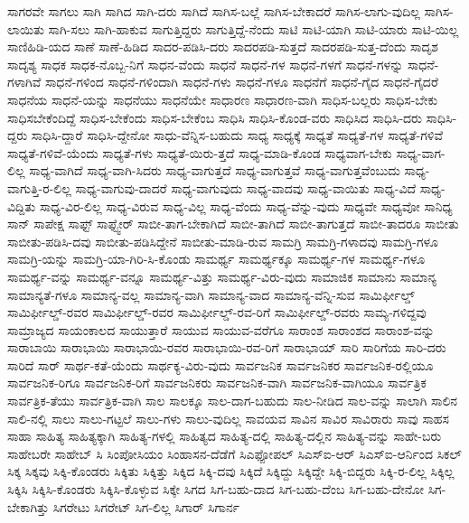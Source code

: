 {ಸಾಗರವೇ
ಸಾಗಲು
ಸಾಗಿ
ಸಾಗಿದ
ಸಾಗಿ-ದರು
ಸಾಗಿದೆ
ಸಾಗಿಸ-ಬಲ್ಲೆ
ಸಾಗಿಸ-ಬೇಕಾದರೆ
ಸಾಗಿಸ-ಲಾಗು-ವುದಿಲ್ಲ
ಸಾಗಿಸ-ಲಾಯಿತು
ಸಾಗಿ-ಸಲು
ಸಾಗಿ-ಹಾಕುವ
ಸಾಗುತ್ತಿದ್ದರು
ಸಾಗುತ್ತಿದ್ದೆ-ನೆಂದು
ಸಾಟಿ
ಸಾಟಿ-ಯಾಗಿ
ಸಾಟಿ-ಯಾರು
ಸಾಟಿ-ಯಿಲ್ಲ
ಸಾಣಿಹಿಡಿ-ಯದ
ಸಾಣೆ
ಸಾಣೆ-ಹಿಡಿದ
ಸಾದರ-ಪಡಿಸಿ-ದರು
ಸಾದರಪಡಿ-ಸುತ್ತದೆ
ಸಾದರಪಡಿ-ಸುತ್ತ-ದೆಂದು
ಸಾದೃಶ
ಸಾದೃಶ್ಯ
ಸಾಧಕ
ಸಾಧಕ-ನೊಬ್ಬ-ನಿಗೆ
ಸಾಧನ-ವೆಂದು
ಸಾಧನೆ
ಸಾಧನೆ-ಗಳ
ಸಾಧನೆ-ಗಳಗೆ
ಸಾಧನೆ-ಗಳನ್ನು
ಸಾಧನೆ-ಗಳಾಗಿವೆ
ಸಾಧನೆ-ಗಳಿಂದ
ಸಾಧನೆ-ಗಳಿಂದಾಗಿ
ಸಾಧನೆ-ಗಳು
ಸಾಧನೆ-ಗಳೂ
ಸಾಧನೆಗೆ
ಸಾಧನೆ-ಗೈದ
ಸಾಧನೆ-ಗೈದರೆ
ಸಾಧನೆಯ
ಸಾಧನೆ-ಯನ್ನು
ಸಾಧನೆಯು
ಸಾಧನೆಯೇ
ಸಾಧಾರಣ
ಸಾಧಾರಣ-ವಾಗಿ
ಸಾಧಿಸ-ಬಲ್ಲರು
ಸಾಧಿಸ-ಬೇಕು
ಸಾಧಿಸಬೇಕೆಂದಿದ್ದೆ
ಸಾಧಿಸ-ಬೇಕೆಂದು
ಸಾಧಿಸ-ಬೇಕೆಂಬ
ಸಾಧಿಸಿ
ಸಾಧಿಸಿ-ಕೊಂಡ-ವರು
ಸಾಧಿಸಿದ
ಸಾಧಿಸಿ-ದರು
ಸಾಧಿಸಿ-ದ್ದರು
ಸಾಧಿಸಿ-ದ್ದಾರೆ
ಸಾಧಿಸಿ-ದ್ದೇನೋ
ಸಾಧು-ವೆನ್ನಿಸ-ಬಹುದು
ಸಾಧ್ಯ
ಸಾಧ್ಯಕ್ಕೆ
ಸಾಧ್ಯತೆ
ಸಾಧ್ಯತೆ-ಗಳ
ಸಾಧ್ಯತೆ-ಗಳಿವೆ
ಸಾಧ್ಯತೆ-ಗಳಿವೆ-ಯೆಂದು
ಸಾಧ್ಯತೆ-ಗಳು
ಸಾಧ್ಯತೆ-ಯಿರು-ತ್ತದೆ
ಸಾಧ್ಯ-ಮಾಡಿ-ಕೊಂಡ
ಸಾಧ್ಯವಾಗ-ಬೇಕು
ಸಾಧ್ಯ-ವಾಗ-ಲಿಲ್ಲ
ಸಾಧ್ಯ-ವಾಗಿದೆ
ಸಾಧ್ಯ-ವಾಗಿ-ಸಿದರು
ಸಾಧ್ಯ-ವಾಗುತ್ತದೆ
ಸಾಧ್ಯ-ವಾಗುತ್ತವೆ
ಸಾಧ್ಯ-ವಾಗುತ್ತವೆಂಬುದು
ಸಾಧ್ಯ-ವಾಗುತ್ತಿ-ರ-ಲಿಲ್ಲ
ಸಾಧ್ಯ-ವಾಗುವು-ದಾದರೆ
ಸಾಧ್ಯ-ವಾಗುವುದು
ಸಾಧ್ಯ-ವಾದವು
ಸಾಧ್ಯ-ವಾಯಿತು
ಸಾಧ್ಯ-ವಿದೆ
ಸಾಧ್ಯ-ವಿದ್ದಿತು
ಸಾಧ್ಯ-ವಿರ-ಲಿಲ್ಲ
ಸಾಧ್ಯ-ವಿರುವ
ಸಾಧ್ಯ-ವಿಲ್ಲ
ಸಾಧ್ಯ-ವೆಂದು
ಸಾಧ್ಯ-ವೆನ್ನು-ವುದು
ಸಾಧ್ಯವೇ
ಸಾಧ್ಯವೋ
ಸಾನಿಧ್ಯ
ಸಾನ್
ಸಾಪೇಕ್ಷ
ಸಾಫ್ಟ್
ಸಾಫ್ಟ್ವೇರ್
ಸಾಬೀ-ತಾಗ-ಬೇಕಾಗಿದೆ
ಸಾಬೀ-ತಾಗಿದೆ
ಸಾಬೀ-ತಾಗುತ್ತದೆ
ಸಾಬೀ-ತಾದರೂ
ಸಾಬೀತು
ಸಾಬೀತು-ಪಡಿಸಿ-ದವು
ಸಾಬೀತು-ಪಡಿಸಿದ್ದೇನೆ
ಸಾಬೀತು-ಮಾಡಿ-ರುವ
ಸಾಮಗ್ರಿ
ಸಾಮಗ್ರಿ-ಗಳಾದವು
ಸಾಮಗ್ರಿ-ಗಳೂ
ಸಾಮಗ್ರಿ-ಯನ್ನು
ಸಾಮಗ್ರಿ-ಯಾ-ಗಿರಿ-ಸಿ-ಕೊಂಡು
ಸಾಮರ್ಥ್ಯ
ಸಾಮರ್ಥ್ಯಕ್ಕೂ
ಸಾಮರ್ಥ್ಯ-ಗಳ
ಸಾಮರ್ಥ್ಯ-ಗಳೂ
ಸಾಮರ್ಥ್ಯ-ವನ್ನು
ಸಾಮರ್ಥ್ಯ-ವನ್ನೂ
ಸಾಮರ್ಥ್ಯ-ವಿತ್ತು
ಸಾಮರ್ಥ್ಯ-ವಿರು-ವುದು
ಸಾಮಾಜಿಕ
ಸಾಮಾನು
ಸಾಮಾನ್ಯ
ಸಾಮಾನ್ಯತೆ-ಗಳೂ
ಸಾಮಾನ್ಯ-ವಲ್ಲ
ಸಾಮಾನ್ಯ-ವಾಗಿ
ಸಾಮಾನ್ಯ-ವಾದ
ಸಾಮಾನ್ಯ-ವೆನ್ನಿ-ಸುವ
ಸಾಮಿರ್ಫೀಲ್ಡ್
ಸಾಮಿರ್ಫೀಲ್ಡ್-ರವರ
ಸಾಮಿರ್ಫೀಲ್ಡ್-ರವರ
ಸಾಮಿರ್ಫೀಲ್ಡ್-ರವ-ರಿಗೆ
ಸಾಮಿರ್ಫೀಲ್ಡ್-ರವರು
ಸಾಮ್ಯ-ಗಳಿದ್ದವು
ಸಾಮ್ರಾಜ್ಯದ
ಸಾಯಂಕಾಲದ
ಸಾಯುತ್ತಾರೆ
ಸಾಯುವ
ಸಾಯುವ-ವರೆಗೂ
ಸಾರಾಂಶ
ಸಾರಾಂಶದ
ಸಾರಾಂಶ-ವನ್ನು
ಸಾರಾಬಾಯಿ
ಸಾರಾಭಾಯಿ
ಸಾರಾಭಾಯಿ-ರವರ
ಸಾರಾಭಾಯಿ-ರವ-ರಿಗೆ
ಸಾರಾಭಾಯ್
ಸಾರಿ
ಸಾರಿಗೆಯ
ಸಾರಿ-ದರು
ಸಾರಿದೆ
ಸಾರ್
ಸಾರ್ಥ-ಕತೆ-ಯೆಂದು
ಸಾರ್ಥಕ್ಯ-ವಿರು-ವುದು
ಸಾರ್ವಜನಿಕ
ಸಾರ್ವಜನಿಕರ
ಸಾರ್ವಜನಿಕ-ರಲ್ಲಿಯೂ
ಸಾರ್ವಜನಿಕ-ರಿಗೂ
ಸಾರ್ವಜನಿಕ-ರಿಗೆ
ಸಾರ್ವಜನಿಕರು
ಸಾರ್ವಜನಿಕ-ವಾಗಿ
ಸಾರ್ವಜನಿಕ-ವಾಗಿಯೂ
ಸಾರ್ವತ್ರಿಕ
ಸಾರ್ವತ್ರಿಕ-ತೆಯು
ಸಾರ್ವತ್ರಿಕ-ವಾಗಿ
ಸಾಲ
ಸಾಲಕ್ಕೂ
ಸಾಲ-ದಾಗ-ಬಹುದು
ಸಾಲ-ನೀಡಿದ
ಸಾಲ-ವನ್ನು
ಸಾಲಾಗಿ
ಸಾಲಿನ
ಸಾಲಿ-ನಲ್ಲಿ
ಸಾಲು
ಸಾಲು-ಗಟ್ಟಲೆ
ಸಾಲು-ಗಳು
ಸಾಲು-ವುದಿಲ್ಲ
ಸಾವಯವ
ಸಾವಿನ
ಸಾವಿರ
ಸಾವಿರಾರು
ಸಾವು
ಸಾಹಸ
ಸಾಹಾ
ಸಾಹಿತ್ಯ
ಸಾಹಿತ್ಯಕ್ಕಾಗಿ
ಸಾಹಿತ್ಯ-ಗಳಲ್ಲಿ
ಸಾಹಿತ್ಯದ
ಸಾಹಿತ್ಯ-ದಲ್ಲಿ
ಸಾಹಿತ್ಯ-ದಲ್ಲಿನ
ಸಾಹಿತ್ಯ-ವನ್ನು
ಸಾಹೇ-ಬರು
ಸಾಹೇಬರೇ
ಸಾಹೇಬ್
ಸಿ
ಸಿಂಪೋಸಿಯಂ
ಸಿಂಹಾಸನ-ದೆಡೆಗೆ
ಸಿಎಫ್ಪೋಪಲ್
ಸಿಎಸ್ಐ-ಆರ್
ಸಿಎಸ್ಐ-ಆರ್ನಿಂದ
ಸಿಕಲ್
ಸಿಕ್ಕ
ಸಿಕ್ಕವು
ಸಿಕ್ಕಿ-ಕೊಂಡರು
ಸಿಕ್ಕಿತು
ಸಿಕ್ಕಿತ್ತು
ಸಿಕ್ಕಿದ
ಸಿಕ್ಕಿ-ದವು
ಸಿಕ್ಕಿದೆ
ಸಿಕ್ಕಿದ್ದು
ಸಿಕ್ಕಿದ್ದೇ
ಸಿಕ್ಕಿ-ಬಿದ್ದರು
ಸಿಕ್ಕಿ-ರ-ಲಿಲ್ಲ
ಸಿಕ್ಕಿಲ್ಲ
ಸಿಕ್ಕಿಸಿ
ಸಿಕ್ಕಿಸಿ-ಕೊಂಡರು
ಸಿಕ್ಕಿಸಿ-ಕೊಳ್ಳುವ
ಸಿಕ್ಕೇ
ಸಿಗದ
ಸಿಗ-ಬಹು-ದಾದ
ಸಿಗ-ಬಹು-ದೆಂಬ
ಸಿಗ-ಬಹು-ದೇನೋ
ಸಿಗ-ಬೇಕಾಗಿತ್ತು
ಸಿಗರೇಟು
ಸಿಗರೇಟ್
ಸಿಗ-ಲಿಲ್ಲ
ಸಿಗಾರ್
ಸಿಗಾರ್ನ
}

